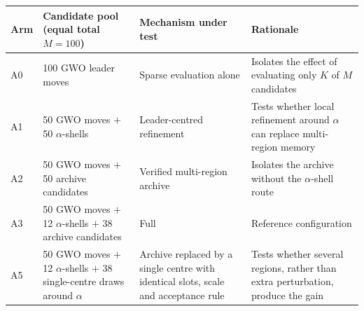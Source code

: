 \begin{tabular}{p{1.2cm}p{4.0cm}p{3.4cm}p{6.4cm}}
\toprule
Arm & Candidate pool (equal total $M=100$) & Mechanism under test & Rationale \\
\midrule
A0 & 100 GWO leader moves & Sparse evaluation alone & Isolates the effect of evaluating only $K$ of $M$ candidates \\
A1 & 50 GWO moves $+$ 50 $\alpha$-shells & Leader-centred refinement & Tests whether local refinement around $\alpha$ can replace multi-region memory \\
A2 & 50 GWO moves $+$ 50 archive candidates & Verified multi-region archive & Isolates the archive without the $\alpha$-shell route \\
A3 & 50 GWO moves $+$ 12 $\alpha$-shells $+$ 38 archive candidates & Full \method{} & Reference configuration \\
A5 & 50 GWO moves $+$ 12 $\alpha$-shells $+$ 38 single-centre draws around $\alpha$ & Archive replaced by a single centre with identical slots, scale and acceptance rule & Tests whether several regions, rather than extra perturbation, produce the gain \\
\bottomrule
\end{tabular}

